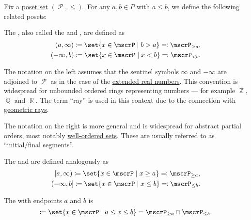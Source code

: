 \begin{definition}\label{def:poset_interval}
  Fix a \hyperref[def:poset]{poset set} \( (\mscrP, \leq) \). For any \( a, b \in P \) with \( a \leq b \), we define the following related posets:

  \begin{thmenum}
     The , also called the  and , are defined as
    \begin{equation*}
      \begin{aligned}
        (a, \infty) \coloneqq \set{ x \in \mscrP \given b > a } \eqqcolon \mscrP_{>a},
        \\
        (-\infty, b) \coloneqq \set{ x \in \mscrP \given x < b } \eqqcolon \mscrP_{<b}.
      \end{aligned}
    \end{equation*}

    The notation on the left assumes that the sentinel symbols \( \infty \) and \( -\infty \) are adjoined to \( \mscrP \) as in the case of the \hyperref[def:extended_real_numbers]{extended real numbers}. This convention is widespread for unbounded ordered rings representing numbers --- for example \hyperref[def:integers]{\( \BbbZ \)}, \hyperref[def:rational_numbers]{\( \BbbQ \)} and \hyperref[def:real_numbers]{\( \BbbR \)}. The term \enquote{ray} is used in this context due to the connection with \hyperref[def:geometric_ray]{geometric rays}.

    The notation on the right is more general and is widespread for abstract partial orders, most notably \hyperref[def:well_ordered_set]{well-ordered sets}. These are usually referred to as \enquote{initial/final segments}.

    The  and  are defined analogously as
    \begin{equation*}
      \begin{aligned}
        [a, \infty) \coloneqq \set{ x \in \mscrP \given x \geq a } \eqqcolon \mscrP_{\geq a},
        \\
        (-\infty, b] \coloneqq \set{ x \in \mscrP \given x \leq b } \eqqcolon \mscrP_{\leq b}.
      \end{aligned}
    \end{equation*}

     The  with endpoints \( a \) and \( b \) is
    \begin{equation*}
      [a, b] \coloneqq \set{ x \in \mscrP \given a \leq x \leq b } = \mscrP_{\geq a} \cap \mscrP_{\leq b}.
    \end{equation*}


\end{thmenum}
\end{definition}
